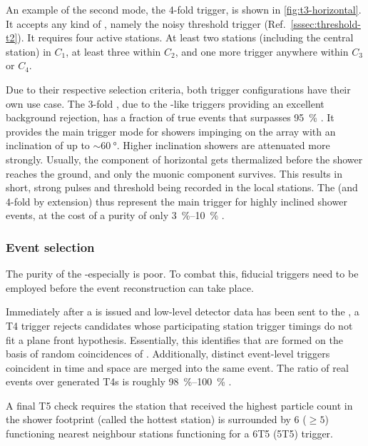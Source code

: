 An example of the second mode, the 4-fold \TTHREE trigger, is shown in 
\cref{fig:t3-horizontal}. It accepts any kind of \TTWO, namely the noisy 
threshold trigger (Ref.\ \cref{sssec:threshold-t2}). It requires four active 
stations. At least two stations (including the central station) in 
$C_1$, at least three within $C_2$, and one more trigger anywhere within $C_3$
or $C_4$.

Due to their respective selection criteria, both trigger configurations have 
their own use case. The 3-fold \TTHREE, due to the \ToT-like \TTWO triggers
providing an excellent background rejection, has a fraction of true \EAS events
that surpasses \SI{95}{\percent} . It provides the main 
trigger mode for showers impinging on the array with an inclination of up 
to $\sim\SI{60}{\degree}$. Higher inclination showers are attenuated more 
strongly. Usually, the \EM component of horizontal \EASs gets thermalized 
before the shower reaches the ground, and only the muonic component survives. 
This results in short, strong pulses and threshold \TTWOs being recorded in the
local stations. The \SB \TTWO (and 4-fold \TTHREE by extension) thus represent 
the main trigger for highly inclined shower events, at the cost of a purity of 
only \SIrange{3}{10}{\percent}  \cite{abrahamTriggerApertureSurface2010}.

\subsubsection{Event selection}

The purity of the \SD-\TTHREEs especially is poor. To combat this, fiducial 
triggers need to be employed before the event reconstruction can take place. 

Immediately after a \TTHREE is issued and low-level detector data has been sent
to the \CDAS, a T4 trigger rejects \TTHREE candidates whose participating 
station trigger timings do not fit a plane front hypothesis. Essentially, this 
identifies \TTHREEs that are formed on the basis of random coincidences of 
\TTWOs. Additionally, distinct event-level triggers coincident in time and 
space are merged into the same event. The ratio of real \EAS events over 
generated T4s is roughly \SIrange{98}{100}{\percent} \cite{abrahamTriggerApertureSurface2010}. 

A final T5 check requires the station that received the highest particle count
in the shower footprint (called the hottest station) is surrounded by 6 
($\geq5$) 
functioning nearest neighbour stations functioning for a 6T5 (5T5) trigger. 


